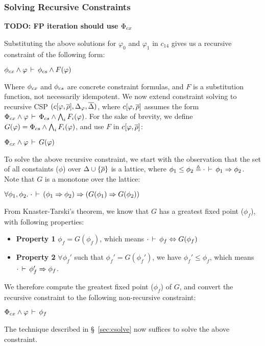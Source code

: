 \subsubsection{Solving Recursive Constraints}

\textbf{TODO: FP iteration should use $\Phi_{cx}$}

Substituting the above solutions for $\varphi_0$ and $\varphi_1$ in
$c_{14}$ gives us a recursive constraint of the following form:
\begin{center}
\(
  \phi_{cx} \wedge \varphi\,\vdash\,\phi_{cs} \wedge F(\varphi)
\)
\end{center}
Where $\phi_{cx}$ and $\phi_{cs}$ are concrete constraint formulas, and
$F$ is a substitution function, not necessarily idempotent. We now
extend constraint solving to recursive CSP $(c\lbrack \varphi,\overline{\rho} \rbrack,\Delta_{\varphi},\overline{\Delta})$, where $c\lbrack
\varphi,\overline{\rho} \rbrack$ assumes the form $\Phi_{cx} \wedge
\varphi\,\vdash\,\Phi_{cs} \wedge \bigwedge_i F_i(\varphi)$. For the sake of
brevity, we define $G(\varphi) = \Phi_{cs} \wedge \bigwedge_i
F_i(\varphi)$, and use $F$ in $c\lbrack \varphi,\overline{\rho} \rbrack$: 
\begin{center}
\(
  \Phi_{cx} \wedge \varphi\,\vdash\,G(\varphi)
\)
\end{center}
To solve the above recursive constraint, we start with the observation
that the set of all constaints ($\phi$) over $\Delta \cup
\{\overline{\rho}\}$ is a lattice, where $\phi_1 \le \phi_2 \triangleq
\cdot\,\vdash\,\phi_1 \Rightarrow \phi_2$. Note that $G$ is a
monotone over the lattice:
\begin{center}
  $\forall \phi_1,\phi_2.\; \cdot\,\vdash\,(\phi_1 \Rightarrow
  \phi_2) \Rightarrow (G(\phi_1) \Rightarrow G(\phi_2))$
\end{center}
From Knaster-Tarski's theorem, we know that $G$ has a greatest fixed
point ($\phi_f$), with following properties:
\begin{itemize}
\item \textbf{Property 1} $\phi_f = G(\phi_f)$, which means
$\cdot\,\vdash\,\phi_f \Leftrightarrow G(\phi_f)$
\item \textbf{Property 2} $\forall \phi_f'$ such that $\phi_f' =
G(\phi_f')$, we have $\phi_f' \le \phi_f$, which means $\cdot\,\vdash\,\phi_f' \Rightarrow \phi_f$.
\end{itemize}
We therefore compute the greatest fixed point ($\phi_f$) of $G$, and
convert the recursive constraint to the following non-recursive
constraint:
\begin{center}
\(
  \Phi_{cx} \wedge \varphi\,\vdash\,\phi_f
\)
\end{center}
The technique described in \S~\ref{sec:csolve} now suffices to solve
the above constraint.


